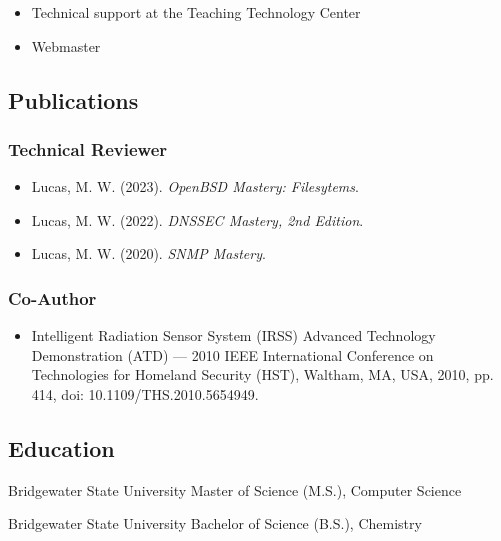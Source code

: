 \documentclass[letterpaper,11pt]{article}
\begin{document}
\begin{itemize}
\item Technical support at the Teaching Technology Center
\item Webmaster
\end{itemize}

\subsection*{Publications}

\subsubsection*{Technical Reviewer}
\begin{itemize}
\item Lucas, M. W. (2023). \textit{OpenBSD Mastery: Filesytems}.
\item Lucas, M. W. (2022). \textit{DNSSEC Mastery, 2nd Edition}.
\item Lucas, M. W. (2020). \textit{SNMP Mastery}.
\end{itemize}

\subsubsection*{Co-Author}
\begin{itemize}
\item Intelligent Radiation Sensor System (IRSS) Advanced Technology
  Demonstration (ATD) --- 2010 IEEE International Conference on Technologies
  for Homeland Security (HST), Waltham, MA, USA, 2010, pp. 414, doi:
  10.1109/THS.2010.5654949.
\end{itemize}

\subsection*{Education}

Bridgewater State University
Master of Science (M.S.), Computer Science

Bridgewater State University
Bachelor of Science (B.S.), Chemistry
\end{document}

